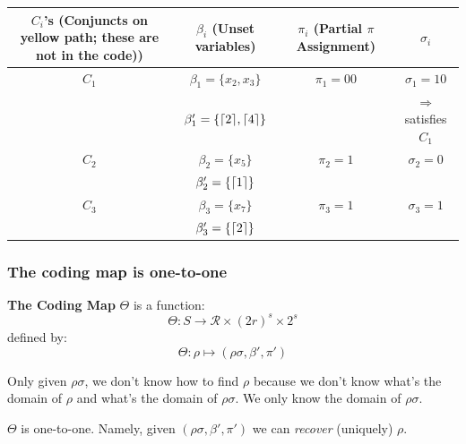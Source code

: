 \noindent{}
\begin{center}
\begin{tabular}{|c|c|c|c|}
\hline
\( C_i \)'s ({\tiny Conjuncts on yellow path; these are not in the code)}) & \( \beta_i \) (Unset variables) & \( \pi_i \) (Partial \( \pi \) Assignment) & \( \sigma_i \) \\ 
\hline
\( C_1 \) & \( \beta_1 = \{x_2, x_3\} \) & \( \pi_1 = 00 \) & \( \sigma_1 = 10 \) \\
         & \( \beta_1' = \{{\lceil{2}\rceil}, {\lceil{4}\rceil}\} \) & & \( \Rightarrow \) satisfies \( C_1 \) \\
\hline
\( C_2 \) & \( \beta_2 = \{x_5\} \) & \( \pi_2 = 1 \) & \( \sigma_2 = 0 \) \\
         & \( \beta_2' = \{{\lceil{1}\rceil}\} \) & & \\
\hline
\( C_3 \) & \( \beta_3 = \{x_7\} \) & \( \pi_3 = 1 \) & \( \sigma_3 = 1 \) \\
         & \( \beta_3' = \{{\lceil{2}\rceil}\} \) & & \\
\hline
\end{tabular}
\end{center}

 
\subsubsection{The coding map is one-to-one}   

\noindent
\textbf{The Coding Map} \( \Theta \) is a function:
\[
\Theta: S \to \mathcal{R} \times (2r)^s \times 2^s
\]
defined by:
\[
\Theta: \rho \mapsto (\rho\sigma, \beta', \pi')
\]

\begin{note}
Only given \( \rho\sigma \), we don't know how to find \( \rho \) because we don't know what's the domain of \( \rho \) and what's the domain of \( \rho\sigma \). We only know the domain of \( \rho\sigma \).
\end{note}

\begin{claim}
\(\Theta\) is one-to-one. Namely, given \( (\rho\sigma, \beta', \pi') \) we can \emph{recover} (uniquely) \( \rho \).
\end{claim}

